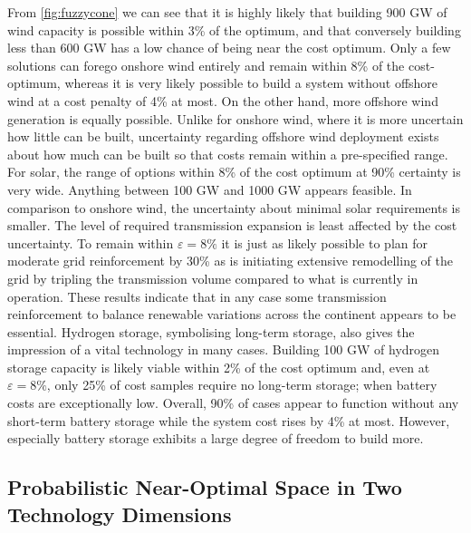 From \cref{fig:fuzzycone} we can see that it is 
highly likely that building 900 GW of wind capacity is possible within 3\% of the optimum, and that
conversely building less than 600 GW has a low chance of being near the cost optimum.
Only a few solutions can forego onshore wind entirely and remain within 8\% of the cost-optimum,
whereas it is very likely possible to build a system without offshore wind at a cost penalty of 4\% at most.
On the other hand, more offshore wind generation is equally possible.
Unlike for onshore wind, where it is more uncertain how little can be built,
uncertainty regarding offshore wind deployment exists about how much can be built
so that costs remain within a pre-specified range.
For solar, the range of options within 8\% of the cost optimum at 90\% certainty is very wide.
Anything between 100 GW and 1000 GW appears feasible.
In comparison to onshore wind, the uncertainty about minimal solar requirements is smaller.
The level of required transmission expansion is least affected by the cost uncertainty.
To remain within $\varepsilon=8\%$ it is just as likely possible to
plan for moderate grid reinforcement by 30\% as 
is initiating extensive remodelling of the grid by tripling the transmission volume
compared to what is currently in operation.
These results indicate that in any case some transmission reinforcement
to balance renewable variations across the continent appears to be essential.
Hydrogen storage, symbolising long-term storage, also gives the impression of a vital technology in many cases.
Building 100 GW of hydrogen storage capacity is likely viable within 2\% of the cost optimum 
and, even at $\varepsilon=8\%$, only 25\% of cost samples require no long-term storage; 
when battery costs are exceptionally low.
Overall, 90\% of cases appear to function without any short-term battery storage
while the system cost rises by 4\% at most.
However, especially battery storage exhibits a large degree of freedom to build more.

\subsection{Probabilistic Near-Optimal Space in Two Technology Dimensions}


